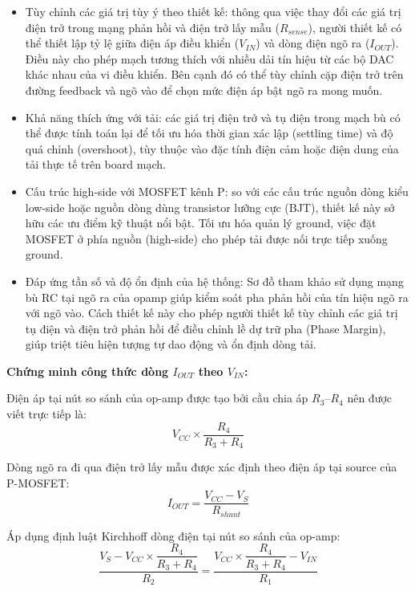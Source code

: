\begin{itemize}
    \item Tùy chỉnh các giá trị tùy ý theo thiết kế: thông qua việc thay đổi các giá trị điện trở trong mạng phản hồi và điện trở lấy mẫu ($R_{sense}$), người thiết kế có thể thiết lập tỷ lệ giữa điện áp điều khiển ($V_{IN}$) và dòng điện ngõ ra ($I_{OUT}$). Điều này cho phép mạch tương thích với nhiều dải tín hiệu từ các bộ DAC khác nhau của vi điều khiển. Bên cạnh đó có thể tùy chỉnh cặp điện trở trên đường feedback và ngõ vào để chọn mức điện áp bật ngõ ra mong muốn.
    \item Khả năng thích ứng với tải: các giá trị điện trở và tụ điện trong mạch bù có thể được tính toán lại để tối ưu hóa thời gian xác lập (settling time) và độ quá chỉnh (overshoot), tùy thuộc vào đặc tính điện cảm hoặc điện dung của tải thực tế trên board mạch.
    \item Cấu trúc high-side với MOSFET kênh P: so với các cấu trúc nguồn dòng kiểu low-side hoặc nguồn dòng dùng transistor lưỡng cực (BJT), thiết kế này sở hữu các ưu điểm kỹ thuật nổi bật. Tối ưu hóa quản lý ground, việc đặt MOSFET ở phía nguồn (high-side) cho phép tải được nối trực tiếp xuống ground.
    \item Đáp ứng tần số và độ ổn định của hệ thống: Sơ đồ tham khảo sử dụng mạng bù RC tại ngõ ra của opamp giúp kiểm soát pha phản hồi của tín hiệu ngõ ra với ngõ vào. Cách thiết kế này cho phép người thiết kế tùy chỉnh các giá trị tụ điện và điện trở phản hồi để điều chỉnh lề dự trữ pha (Phase Margin), giúp triệt tiêu hiện tượng tự dao động và ổn định dòng tải.
\end{itemize}

\textbf{Chứng minh công thức dòng $I_{OUT}$ theo $V_{IN}$:}

Điện áp tại nút so sánh của op-amp được tạo bởi cầu chia áp $R_3$--$R_4$ nên được viết trực tiếp là:
\begin{equation*}
    V_{CC}\times\frac{R_4}{R_3+R_4}
\end{equation*}

Dòng ngõ ra đi qua điện trở lấy mẫu được xác định theo điện áp tại source của P-MOSFET:
\begin{equation*}
    I_{OUT}=\frac{V_{CC}-V_S}{R_{shunt}}
\end{equation*}

Áp dụng định luật Kirchhoff dòng điện tại nút so sánh của op-amp:
\begin{equation*}
    \frac{V_S - V_{CC}\times\dfrac{R_4}{R_3+R_4}}{R_2}
    =
    \frac{V_{CC}\times\dfrac{R_4}{R_3+R_4}-V_{IN}}{R_1}
\end{equation*}

